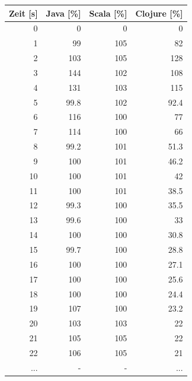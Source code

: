 \documentclass{fancydocument}
\begin{document}
\begin{center}
\begin{tabular}{|r|r|r|r|} \hline
\textbf{Zeit [s]} & \textbf{Java [\%]} & \textbf{Scala [\%]} & \textbf{Clojure [\%]}\\
\hline
0 & 0 & 0 & 0\\
\hline
1 & 99 & 105 & 82\\
\hline
2 & 103 & 105 & 128\\
\hline
3 & 144 & 102 & 108\\
\hline
4 & 131 & 103 & 115\\
\hline
5 & 99.8 & 102 & 92.4\\
\hline
6 & 116 & 100 & 77\\
\hline
7 & 114 & 100 & 66\\
\hline
8 & 99.2 & 101 & 51.3\\
\hline
9 & 100 & 101 & 46.2\\
\hline
10 & 100 & 101 & 42\\
\hline
11 & 100 & 101 & 38.5\\
\hline
12 & 99.3 & 100 & 35.5\\
\hline
13 & 99.6 & 100 & 33\\
\hline
14 & 100 & 100 & 30.8\\
\hline
15 & 99.7 & 100 & 28.8\\
\hline
16 & 100 & 100 & 27.1\\
\hline
17 & 100 & 100 & 25.6\\
\hline
18 & 100 & 100 & 24.4\\
\hline
19 & 107 & 100 & 23.2\\
\hline
20 & 103 & 103 & 22\\
\hline
21 & 105 & 105 & 22\\
\hline
22 & 106 & 105 & 21\\
\hline
... & - & - & ...\\
\hline
\end{tabular}


\end{center}
\end{document}

